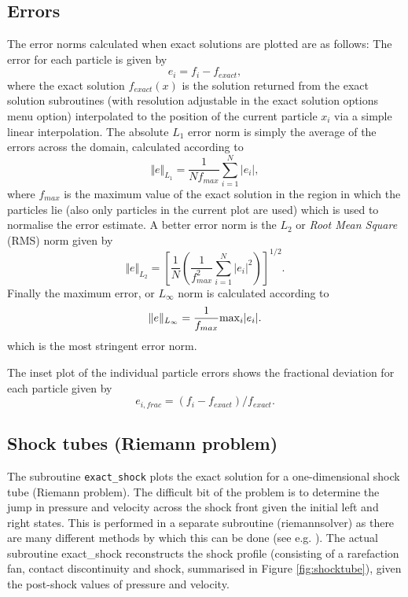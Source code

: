 \documentclass[a4paper,10pt]{article}
\begin{document}
\subsection{Errors}
The error norms calculated when exact solutions are plotted are as follows: The
error for each particle is given by
\begin{equation}
e_i = f_i - f_{exact},
\end{equation}
where the exact solution $f_{exact}(x)$ is the solution returned from the exact
solution subroutines (with resolution adjustable in the exact solution options menu
option) interpolated to the position of the current particle $x_i$ via a simple linear
interpolation. The absolute $L_1$ error norm is simply the average of the errors across
the domain, calculated according to
\begin{equation}
\Vert e \Vert_{L_1} = \frac{1}{N f_{max}} \sum_{i=1}^N \vert e_i \vert,
\end{equation}
where $f_{max}$ is the maximum value of the exact solution in the region in which the
particles lie (also only particles in the current plot are used) which is used to
normalise the error estimate. A better error norm is the $L_2$ or \emph{Root Mean Square}
 (RMS) norm given by
\begin{equation}
\Vert e \Vert_{L_2} = \left[\frac{1}{N} \left( \frac{1}{f_{max}^2} \sum_{i=1}^N \vert e_i
\vert^2 \right)\right]^{1/2}.
\end{equation}
Finally the maximum error, or $L_\infty$ norm is calculated according to
\begin{equation}
\Vert e \Vert_{L_\infty} = \frac{1}{f_{max}} {\rm max}_i \vert e_i \vert.
\end{equation}
which is the most stringent error norm.

 The inset plot of the individual particle errors shows the fractional deviation for
 each particle given by
\begin{equation}
e_{i,frac} = (f_i - f_{exact}) / f_{exact}.
\end{equation}

\subsection{Shock tubes (Riemann problem)}
 The subroutine \verb+exact_shock+ plots the exact solution for a one-dimensional shock tube
(Riemann problem). The difficult bit of the problem is to determine the jump in
pressure and velocity across the shock front given the initial left and right
states. This is performed in a separate subroutine (riemannsolver) as there are 
many different methods by which this can be done (see e.g. \citealt{toro92}). 
The actual subroutine exact\_shock reconstructs the shock profile (consisting of
a rarefaction fan, contact discontinuity and shock, summarised in Figure
\ref{fig:shocktube}), given the post-shock values of pressure and
velocity. 
\end{document}
